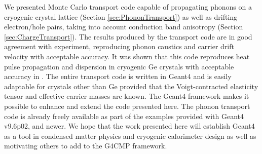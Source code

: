 \documentclass[preprint,12pt]{elsarticle}
\begin{document}
 
 
We presented Monte Carlo transport code capable of propagating phonons on a cryogenic crystal lattice (Section \ref{sec:PhononTransport}) as well as drifting electron/hole pairs, taking into account conduction band anisotropy (Section \ref{sec:ChargeTransport}). The results produced by the transport code are in good agreement with experiment, reproducing phonon caustics and carrier drift velocity with acceptable accuracy. It was shown that this code reproduces heat pulse propagation and dispersion in cryogenic Ge crystals with acceptable accuracy in \cite{Brandt}. The entire transport code is written in Geant4 and is easily adaptable for crystals other than Ge provided that the Voigt-contracted elasticity tensor and effective carrier masses are known. The Geant4 framework makes it possible to enhance and extend the code presented here. The phonon transport code is already freely available as part of the examples provided with  Geant4 v9.6p02, and newer. 
We hope that the work presented here will establish Geant4 as a tool in condensed matter physics and cryogenic calorimeter design as well as motivating others to add to the G4CMP framework.



\end{document}
